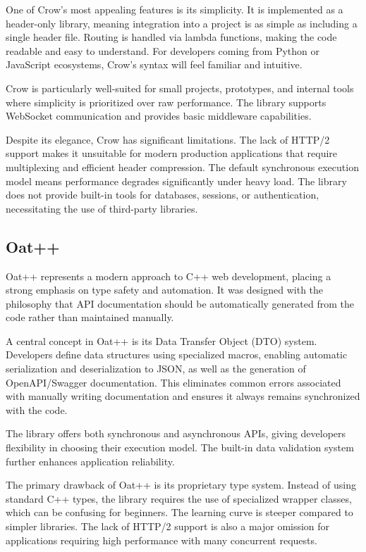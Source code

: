 One of Crow's most appealing features is its simplicity. It is implemented as a header-only library, meaning integration into a project is as simple as including a single header file. Routing is handled via lambda functions, making the code readable and easy to understand. For developers coming from Python or JavaScript ecosystems, Crow's syntax will feel familiar and intuitive.

Crow is particularly well-suited for small projects, prototypes, and internal tools where simplicity is prioritized over raw performance. The library supports WebSocket communication and provides basic middleware capabilities.

Despite its elegance, Crow has significant limitations. The lack of HTTP/2 support makes it unsuitable for modern production applications that require multiplexing and efficient header compression. The default synchronous execution model means performance degrades significantly under heavy load. The library does not provide built-in tools for databases, sessions, or authentication, necessitating the use of third-party libraries.

\subsection{Oat++}

Oat++ \cite{oatpp} represents a modern approach to C++ web development, placing a strong emphasis on type safety and automation. It was designed with the philosophy that API documentation should be automatically generated from the code rather than maintained manually.

A central concept in Oat++ is its Data Transfer Object (DTO) system. Developers define data structures using specialized macros, enabling automatic serialization and deserialization to JSON, as well as the generation of OpenAPI/Swagger documentation. This eliminates common errors associated with manually writing documentation and ensures it always remains synchronized with the code.

The library offers both synchronous and asynchronous APIs, giving developers flexibility in choosing their execution model. The built-in data validation system further enhances application reliability.

The primary drawback of Oat++ is its proprietary type system. Instead of using standard C++ types, the library requires the use of specialized wrapper classes, which can be confusing for beginners. The learning curve is steeper compared to simpler libraries. The lack of HTTP/2 support is also a major omission for applications requiring high performance with many concurrent requests.

